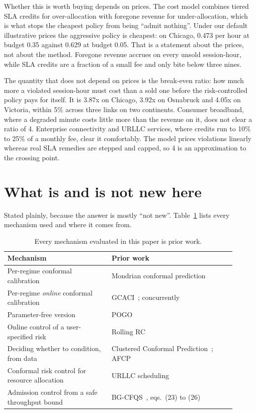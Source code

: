 \documentclass[acmsmall,screen]{acmart}
\begin{document}
Whether this is worth buying depends on prices. The cost model combines tiered SLA credits for over-allocation with foregone revenue for under-allocation, which is what stops the cheapest policy from being ``admit nothing''. Under our default illustrative prices the aggressive policy is cheapest: on Chicago, 0.473 per hour at budget 0.35 against 0.629 at budget 0.05. That is a statement about the prices, not about the method. Foregone revenue accrues on every unsold session-hour, while SLA credits are a fraction of a small fee and only bite below three nines.

The quantity that does not depend on prices is the break-even ratio: how much more a violated session-hour must cost than a sold one before the risk-controlled policy pays for itself. It is 3.87x on Chicago, 3.92x on Osnabruck and 4.05x on Victoria, within 5\% across three links on two continents. Consumer broadband, where a degraded minute costs little more than the revenue on it, does not clear a ratio of 4. Enterprise connectivity and URLLC services, where credits run to 10\% to 25\% of a monthly fee, clear it comfortably. The model prices violations linearly whereas real SLA remedies are stepped and capped, so 4 is an approximation to the crossing point.

\section{What is and is not new here}
\label{sec:prior}

Stated plainly, because the answer is mostly ``not new''. Table~\ref{tab:prior} lists every mechanism used and where it comes from.

\begin{table}[t]
\caption{Every mechanism evaluated in this paper is prior work.}
\label{tab:prior}
\begin{tabular}{p{0.42\linewidth}p{0.5\linewidth}}
\toprule
Mechanism & Prior work \\
\midrule
Per-regime conformal calibration & Mondrian conformal prediction~\cite{vovk2003mondrian} \\
Per-regime \emph{online} conformal calibration & GCACI~\cite{ramalingam2025noregret}; concurrently~\cite{angelopoulos2025gradient} \\
Parameter-free version & POGO~\cite{bharti2026pogo} \\
Online control of a user-specified risk & Rolling RC~\cite{feldman2023rollingrc} \\
Deciding whether to condition, from data & Clustered Conformal Prediction~\cite{ding2023clustered}; AFCP~\cite{afcp2024} \\
Conformal risk control for resource allocation & URLLC scheduling~\cite{cohen2023urllc} \\
Admission control from a safe throughput bound & BG-CFQS~\cite{xie2026bgcfqs}, eqs.~(23) to (26) \\
\bottomrule
\end{tabular}
\end{table}
\end{document}
